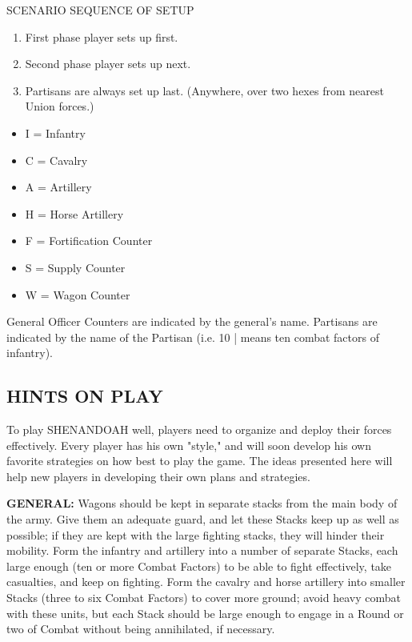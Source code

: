 \begin{scenariodata}
  SCENARIO SEQUENCE OF SETUP
  \begin{enumerate}
    \item First phase player sets up first.
    \item Second phase player sets up next.
    \item Partisans are always set up last. (Anywhere, over two hexes from nearest
  Union forces.)
  \end{enumerate}

  \begin{itemize}
    \item I = Infantry
    \item C = Cavalry
    \item A = Artillery
    \item H = Horse Artillery
    \item F = Fortification Counter
    \item S = Supply Counter
    \item W = Wagon Counter
  \end{itemize}
\end{scenariodata}

General Officer Counters are indicated by the general's name. Partisans are
indicated by the name of the Partisan (i.e. 10 | means ten combat factors of
infantry).

\subsection*{HINTS ON PLAY}

To play SHENANDOAH well, players need to organize and deploy their forces
effectively. Every player has his own "style," and will soon develop his own
favorite strategies on how best to play the game. The ideas presented here will
help new players in developing their own plans and strategies.

\textbf{GENERAL:} Wagons should be kept in separate stacks from the main body of the
army. Give them an adequate guard, and let these Stacks keep up as well as
possible; if they are kept with the large fighting stacks, they will hinder
their mobility. Form the infantry and artillery into a number of separate
Stacks, each large enough (ten or more Combat Factors) to be able to fight
effectively, take casualties, and keep on fighting. Form the cavalry and horse
artillery into smaller Stacks (three to six Combat Factors) to cover more
ground; avoid heavy combat with these units, but each Stack should be large
enough to engage in a Round or two of Combat without being annihilated, if
necessary.

